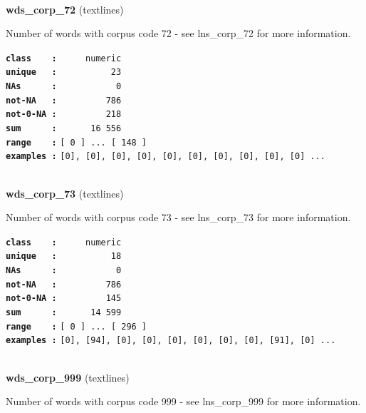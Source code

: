 \documentclass[]{article}
\begin{document}
~

\textbf{wds\_corp\_72} (textlines)

Number of words with corpus code 72 - see lns\_corp\_72 for more
information.

\textbf{\texttt{class\ \ \ \ :}} \texttt{~~~~~numeric}\\
\textbf{\texttt{unique\ \ \ :}} \texttt{~~~~~~~~~~23}\\
\textbf{\texttt{NAs\ \ \ \ \ \ :}} \texttt{~~~~~~~~~~~0}\\
\textbf{\texttt{not-NA\ \ \ :}} \texttt{~~~~~~~~~786}\\
\textbf{\texttt{not-0-NA\ :}} \texttt{~~~~~~~~~218}\\
\textbf{\texttt{sum\ \ \ \ \ \ :}} \texttt{~~~~~~16~556}\\
\textbf{\texttt{range\ \ \ \ :}}
\texttt{{[}\ 0\ {]}\ ...\ {[}\ 148\ {]}}\\
\textbf{\texttt{examples\ :}}
\texttt{{[}0{]},\ {[}0{]},\ {[}0{]},\ {[}0{]},\ {[}0{]},\ {[}0{]},\ {[}0{]},\ {[}0{]},\ {[}0{]},\ {[}0{]}\ ...}\\

~

\textbf{wds\_corp\_73} (textlines)

Number of words with corpus code 73 - see lns\_corp\_73 for more
information.

\textbf{\texttt{class\ \ \ \ :}} \texttt{~~~~~numeric}\\
\textbf{\texttt{unique\ \ \ :}} \texttt{~~~~~~~~~~18}\\
\textbf{\texttt{NAs\ \ \ \ \ \ :}} \texttt{~~~~~~~~~~~0}\\
\textbf{\texttt{not-NA\ \ \ :}} \texttt{~~~~~~~~~786}\\
\textbf{\texttt{not-0-NA\ :}} \texttt{~~~~~~~~~145}\\
\textbf{\texttt{sum\ \ \ \ \ \ :}} \texttt{~~~~~~14~599}\\
\textbf{\texttt{range\ \ \ \ :}}
\texttt{{[}\ 0\ {]}\ ...\ {[}\ 296\ {]}}\\
\textbf{\texttt{examples\ :}}
\texttt{{[}0{]},\ {[}94{]},\ {[}0{]},\ {[}0{]},\ {[}0{]},\ {[}0{]},\ {[}0{]},\ {[}0{]},\ {[}91{]},\ {[}0{]}\ ...}\\

~

\textbf{wds\_corp\_999} (textlines)

Number of words with corpus code 999 - see lns\_corp\_999 for more
information.
\end{document}
